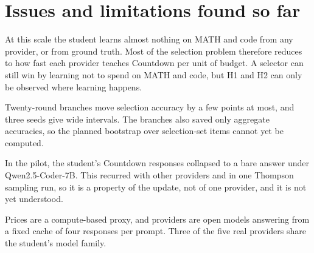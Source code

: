 

\section{Issues and limitations found so far}
\label{ca:sec:issues}

\begin{description}[itemsep=2pt,topsep=3pt]
  \item[Learning is concentrated in one domain.] At this scale the student learns almost
    nothing on MATH and code from any provider, or from ground truth. Most of the
    selection problem therefore reduces to how fast each provider teaches Countdown per
    unit of budget. A selector can still win by learning not to spend on MATH and code,
    but H1 and H2 can only be observed where learning happens.
  \item[Statistical power.] Twenty-round branches move selection accuracy by a few points
    at most, and three seeds give wide intervals. The branches also saved only aggregate
    accuracies, so the planned bootstrap over selection-set items cannot yet be computed.
  \item[Training instability.] In the pilot, the student's Countdown responses collapsed
    to a bare answer under Qwen2.5-Coder-7B. This recurred with other providers and in one Thompson
    sampling run, so it is a property of the update, not of one provider, and it is not yet
    understood.
  \item[Simulated providers.] Prices are a compute-based proxy, and providers are open
    models answering from a fixed cache of four responses per prompt. Three of the five
    real providers share the student's model family.
\end{description}
